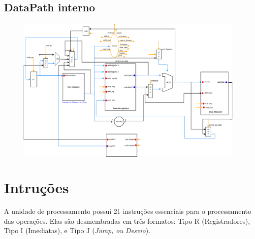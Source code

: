 \documentclass{report}
\begin{document}
  \begin{landscape}
  	\section{DataPath interno}
  	\begin{figure}[H]
  		\centering
  		\includegraphics[width=600px]{./pictures/datapath/DataPath.png}
  	\end{figure}
  \end{landscape}
  
  \section{Intruções}
  A unidade de processamento possui 21 instruções essenciais para o processamento das operações. Elas são desmembradas em três formatos: Tipo R (Registradores), Tipo I (Imediatas), e Tipo J (\textit{Jump, ou Desvio}).
  
\end{document}
